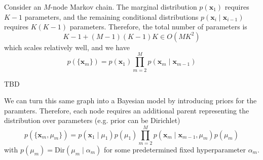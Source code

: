   \begin{example}
    Consider an $M$-node Markov chain. The marginal distribution $p(\mathbf{x}_1)$ requires $K-1$ parameters, and the remaining conditional distributions $p(\mathbf{x}_i \mid \mathbf{x}_{i-1})$ requires $K(K-1)$ parameters. Therefore, the total number of parameters is 
    \begin{equation}
      K-1 + (M-1) (K-1) K \in O(M K^2)
    \end{equation}
    which scales relatively well, and we have 
    \begin{equation}
      p(\{\mathbf{x}_m\}) = p (\mathbf{x}_1) \prod_{m=2}^M p(\mathbf{x}_m \mid \mathbf{x}_{m-1})
    \end{equation}
    \begin{center}
      TBD
    \end{center}
    We can turn this same graph into a Bayesian model by introducing priors for the paramters. Therefore, each node requires an additional parent representing the distribution over parameters (e.g. prior can be Dirichlet)  
    \begin{equation}
      p(\{\mathbf{x}_m , \mu_m\}) = p(\mathbf{x}_1 \mid \mu_1) p(\mu_1) \prod_{m=2}^M p(\mathbf{x}_m \mid \mathbf{x}_{m-1}, \mu_m) p(\mu_m)
    \end{equation}
    with $p(\mu_m) = \mathrm{Dir}(\mu_m \mid \alpha_m)$ for some predetermined fixed hyperparameter $\alpha_m$. 

    \begin{figure}[H]
      \centering 
\end{figure}
\end{example}
